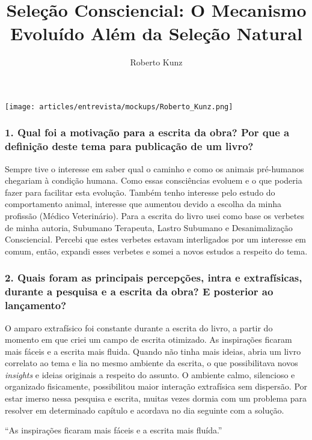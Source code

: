 \documentclass{gescons}
\author{Roberto Kunz}
\title{Seleção Consciencial: O Mecanismo Evoluído Além da Seleção Natural}
\begin{document}
    \makeentrevistatitle

    \begin{multicols}{2}

\begin{center}
    \texttt{[image: articles/entrevista/mockups/Roberto\_Kunz.png]}
\end{center}


\subsubsection{1. Qual foi a motivação para a escrita da obra? Por que a definição deste tema para publicação de um livro?}

Sempre tive o interesse em saber qual o caminho e como os animais pré-humanos chegariam à condição humana. Como essas consciências evoluem e o que poderia fazer para facilitar esta evolução. Também tenho interesse pelo estudo do comportamento animal, interesse que aumentou devido a escolha da minha profissão (Médico Veterinário). Para a escrita do livro usei como base os verbetes de minha autoria, Subumano Terapeuta, Lastro Subumano e Desanimalização Consciencial. Percebi que estes verbetes estavam interligados por um interesse em comum, então, expandi esses verbetes e somei a novos estudos a respeito do tema.

\subsubsection{2. Quais foram as principais percepções, intra e extrafísicas, durante a pesquisa e a escrita da obra? E posterior ao lançamento?}

O amparo extrafísico foi constante durante a escrita do livro, a partir do momento em que criei um campo de escrita otimizado. As inspirações ficaram mais fáceis e a escrita mais fluida. Quando não tinha mais ideias, abria um livro correlato ao tema e lia no mesmo ambiente da escrita, o que possibilitava novos \emph{insights} e ideias originais a respeito do assunto. O ambiente calmo, silencioso e organizado fisicamente, possibilitou maior interação extrafísica sem dispersão. Por estar imerso nessa pesquisa e escrita, muitas vezes dormia com um problema para resolver em determinado capítulo e acordava no dia seguinte com a solução.

\begin{pullquote}
    ``As inspirações ficaram mais fáceis e a escrita mais fluída.''
\end{pullquote}


\end{multicols}
\end{document}
